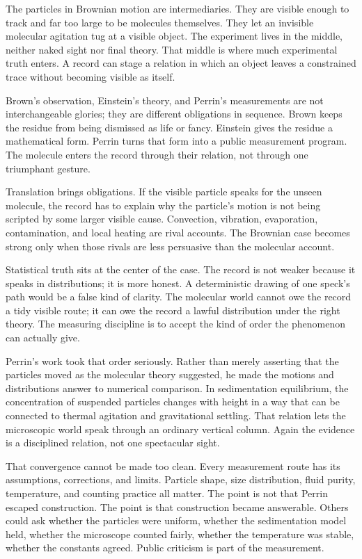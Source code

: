 The particles in Brownian motion are intermediaries. They are visible
enough to track and far too large to be molecules themselves. They let an
invisible molecular agitation tug at a visible object. The experiment
lives in the middle, neither naked sight nor final theory. That middle is
where much experimental truth enters. A record can stage a relation in
which an object leaves a constrained trace without becoming visible as
itself.

Brown's observation, Einstein's theory, and Perrin's measurements are
not interchangeable glories; they are different obligations in sequence.
Brown keeps the residue from being dismissed as life or fancy. Einstein
gives the residue a mathematical form. Perrin turns that form into a
public measurement program. The molecule enters the record through their
relation, not through one triumphant gesture.

Translation brings obligations. If the visible particle speaks for the
unseen molecule, the record has to explain why the particle's motion is
not being scripted by some larger visible cause. Convection, vibration,
evaporation, contamination, and local heating are rival accounts. The
Brownian case becomes strong only when those rivals are less persuasive
than the molecular account.

Statistical truth sits at the center of the case. The record is not
weaker because it speaks in distributions; it is more honest. A
deterministic drawing of one speck's path would be a false kind of
clarity. The molecular world cannot owe the record a tidy visible route;
it can owe the record a lawful distribution under the right theory. The
measuring discipline is to accept the kind of order the phenomenon can
actually give.

Perrin's work took that order seriously. Rather than merely asserting
that the particles moved as the molecular theory suggested, he made the
motions and distributions answer to numerical comparison. In sedimentation
equilibrium, the concentration of suspended particles changes with height
in a way that can be connected to thermal agitation and gravitational
settling. That relation lets the microscopic world speak through an
ordinary vertical column. Again the evidence is a disciplined relation,
not one spectacular sight.

That convergence cannot be made too clean. Every measurement route has
its assumptions, corrections, and limits. Particle shape, size
distribution, fluid purity, temperature, and counting practice all
matter. The point is not that Perrin escaped construction. The point is
that construction became answerable. Others could ask whether the
particles were uniform, whether the sedimentation model held, whether
the microscope counted fairly, whether the temperature was stable,
whether the constants agreed. Public criticism is part of the
measurement.

